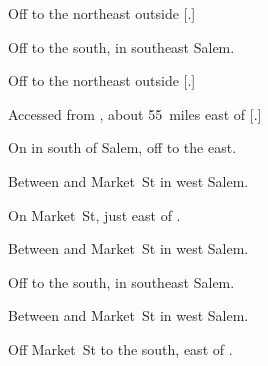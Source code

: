 

\begin{LocationList}

Off   to the northeast outside [.]

Off   to the south, in southeast Salem.

Off   to the northeast outside [.]

Accessed from , about 55~miles east of [.]

\Location{\GasStation \Gas \Rest}
On  in  south of Salem, off  to the east.

\Location{\GarageHQ \Garage}
Between  and Market~St in west Salem.

On  Market~St, just east of  .

Between  and Market~St in west Salem.

Off   to the south, in southeast Salem.

\Location{\RecruitmentAgency \Recruitment}
Between  and Market~St in west Salem.

Off  Market~St to the south, east of  .

\end{LocationList}
